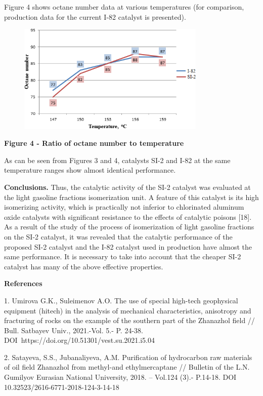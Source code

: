 Figure 4 shows octane number data at various temperatures (for
comparison, production data for the current I-82 catalyst is presented).

\begin{figure}[H]
	\centering
	\includegraphics[width=0.8\textwidth]{assets/1057}
	\caption*{}
\end{figure}

{\bfseries Figure 4 - Ratio of octane number to temperature}

As can be seen from Figures 3 and 4, catalysts SI-2 and I-82 at the same
temperature ranges show almost identical performance.

{\bfseries Conclusions.} Thus, the catalytic activity of the SI-2 catalyst
was evaluated at the light gasoline fractions isomerization unit. A
feature of this catalyst is its high isomerizing activity, which is
practically not inferior to chlorinated aluminum oxide catalysts with
significant resistance to the effects of catalytic poisons {[}18{]}. As
a result of the study of the process of isomerization of light gasoline
fractions on the SI-2 catalyst, it was revealed that the catalytic
performance of the proposed SI-2 catalyst and the I-82 catalyst used in
production have almost the same performance. It is necessary to take
into account that the cheaper SI-2 catalyst has many of the above
effective properties.

{\bfseries References}

1. Umirova G.K., Suleimenov A.O. The use of special high-tech
geophysical equipment (hitech) in the analysis of mechanical
characteristics, anisotropy and fracturing of rocks on the example of
the southern part of the Zhanazhol field // Bull. Satbayev Univ.,
2021.-Vol. 5.- P. 24-38. DOI~https://doi.org/10.51301/vest.su.2021.i5.04

2. Satayeva, S.S., Jubanaliyeva, A.M. Purification of hydrocarbon raw
materials of oil field Zhanazhol from methyl-and ethylmercaptane //
Bulletin of the L.N. Gumilyov Eurasian National University, 2018. --
Vol.124 (3).- P.14-18. DOI 10.32523/2616-6771-2018-124-3-14-18

